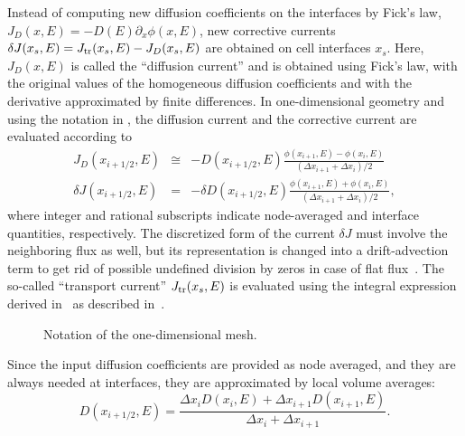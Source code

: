 Instead of computing new diffusion coefficients on the interfaces by Fick's law, $J_D(x,E) = -D(E) \partial_x \phi(x,E)$, new corrective currents $\delta J(x_s,E) = J_{\textrm{\scriptsize{tr}}}(x_s,E) - J_D(x_s,E)$ are obtained on cell interfaces $x_s$. Here, $J_D(x,E)$ is called the ``diffusion current'' and is obtained using Fick's law, with the original values of the homogeneous diffusion coefficients and with the derivative approximated by finite differences. In one-dimensional 
geometry and using the notation in , the diffusion current and the corrective current are evaluated according to
\begin{eqnarray}\label{eq:JD-dJ}
J_D(x_{i+1/2},E) &\cong& -D(x_{i+1/2},E) 
\frac{\phi(x_{i+1},E) - \phi(x_i,E)}
{(\Delta x_{i+1} + \Delta x_i)/2} \nonumber \\
\delta J(x_{i+1/2},E) &=& -\delta D(x_{i+1/2},E) 
\frac{\phi(x_{i+1},E) + \phi(x_i,E)}
{(\Delta x_{i+1} + \Delta x_i)/2} ,
\end{eqnarray}
where integer and rational subscripts indicate node-averaged and interface quantities, respectively. The discretized form of the current $\delta J$ must involve the neighboring flux as well, but its representation is changed into a drift-advection term to get rid of possible undefined division by zeros in case of flat flux~\cite{Smith-1983,Tomatis-2011}. The so-called ``transport current'' $J_{\textrm{\scriptsize{tr}}}(x_s,E)$ is evaluated using the integral expression derived in~ as described in~.

\begin{figure}[htbp!] 
	\centering
	\caption{Notation of the one-dimensional mesh.}
	\label{fig:mesh1D}
\end{figure}
%
Since the input diffusion coefficients are provided as node averaged, and they are always needed at interfaces, they are approximated by local volume averages:
\begin{equation}\label{eq:Ds}
D(x_{i+1/2},E) = \frac{\Delta x_i D(x_i,E) 
	+ \Delta x_{i+1} D(x_{i+1},E)}
{ \Delta x_i + \Delta x_{i+1}} .
\end{equation}

